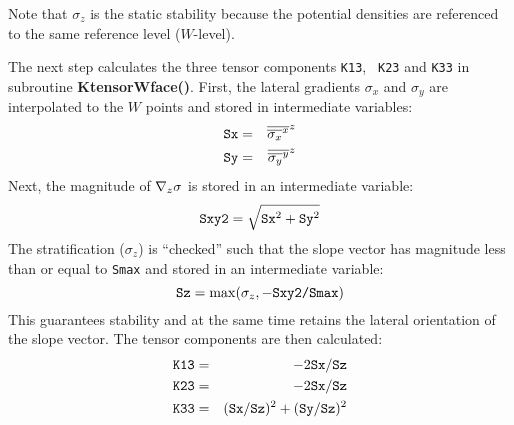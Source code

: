 \documentclass[12pt]{article}
\begin{document}
Note that $\sigma_z$ is the static stability because the potential
densities are referenced to the same reference level ($W$-level).

The next step calculates the three tensor components {\tt K13}, {\tt
K23} and {\tt K33} in subroutine {\bf KtensorWface()}. First, the
lateral gradients $\sigma_x$ and $\sigma_y$ are interpolated to the
$W$ points and stored in intermediate variables:
\begin{eqnarray*}
\mbox{\tt Sx} & = & \overline{ \overline{ \sigma_x }^x }^z \\
\mbox{\tt Sy} & = & \overline{ \overline{ \sigma_y }^y }^z
\end{eqnarray*}
Next, the magnitude of ${\bf \nabla}_z \sigma$ is stored in an intermediate
variable:
\begin{displaymath}
\mbox{\tt Sxy2} = \sqrt{ {\tt Sx}^2 + {\tt Sy}^2 }
\end{displaymath}
The stratification ($\sigma_z$) is ``checked'' such that the slope
vector has magnitude less than or equal to {\tt Smax} and stored in
an intermediate variable:
\begin{displaymath}
\mbox{\tt Sz} = \max ( \sigma_z , - \mbox{\tt Sxy2/Smax} )
\end{displaymath}
This guarantees stability and at the same time retains the lateral
orientation of the slope vector. The tensor components are then calculated:
\begin{eqnarray*}
\mbox{\tt K13} & = & -2 {\tt Sx/Sz} \\
\mbox{\tt K23} & = & -2 {\tt Sx/Sz} \\
\mbox{\tt K33} & = & ({\tt Sx/Sz})^2 + ({\tt Sy/Sz})^2
\end{eqnarray*}
\end{document}
